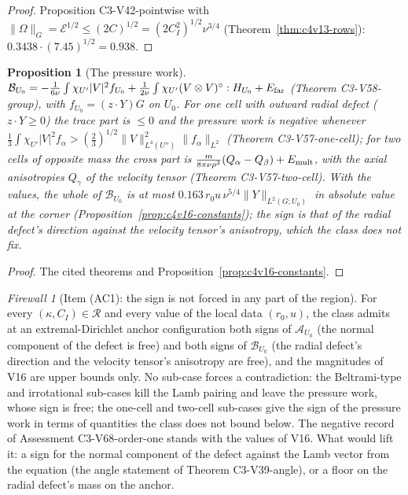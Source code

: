 \documentclass[11pt]{article}
\theoremstyle{plain}
\newtheorem{proposition}[theorem]{Proposition}
\theoremstyle{definition}
\theoremstyle{remark}
\newtheorem{firewall}[theorem]{Firewall}
\begin{document}
\begin{proof}
Proposition C3-V42-pointwise with \(\|\Omega\|_G=\mathcal E^{1/2}\le(2C)^{1/2}=(2C_I^2)^{1/2}\nu^{3/4}\)
(Theorem~\ref{thm:c4v13-rows}): \(0.3438\cdot(7.45)^{1/2}=0.938\).
\end{proof}

\begin{proposition}[The pressure work]
\label{prop:c4v17-pressure}
\(\mathcal B_{U_0}=-\frac1{6\nu}\int\chi_{U'}|V|^2f_{U_0}+\frac1{2\nu}\int\chi_{U'}(V\otimes V)^\circ:H_{U_0}+E_{\rm far}\) (Theorem C3-V58-group),
with \(f_{U_0}=(z\cdot Y)G\) on \(U_0\).  For one cell with outward radial defect
(\(z\cdot Y\ge0\)) the trace part is \(\le0\) and the pressure work is negative
whenever \(\frac13\int\chi_{U'}|V|^2f_\alpha>(\frac23)^{1/2}\|V\|_{L^4(U'')}^2\|f_\alpha\|_{L^2}\) (Theorem C3-V57-one-cell);
for two cells of opposite mass the cross part is
\(\frac m{8\pi\nu\rho^3}(Q_\alpha-Q_\beta)+E_{\rm mult}\), with the axial anisotropies \(Q_\gamma\) of the
velocity tensor (Theorem C3-V57-two-cell).  With the values, the
whole of \(\mathcal B_{U_0}\) is at most \(0.163\,r_0u\,\nu^{5/4}\|Y\|_{L^2(G;U_0)}\) in absolute value at
the corner (Proposition~\ref{prop:c4v16-constants}); the sign is that of
the radial defect's direction against the velocity tensor's
anisotropy, which the class does not fix.
\end{proposition}

\begin{proof}
The cited theorems and Proposition~\ref{prop:c4v16-constants}.
\end{proof}

\begin{firewall}[Item (AC1): the sign is not forced in any part of the region]
\label{fw:c4v17-sign}
For every \((\kappa,C_I)\in\mathcal R\) and every value of the local data \((r_0,u)\), the
class admits at an extremal-Dirichlet anchor configuration both
signs of \(\mathcal A_{U_0}\) (the normal component of the defect is free) and both
signs of \(\mathcal B_{U_0}\) (the radial defect's direction and the velocity
tensor's anisotropy are free), and the magnitudes of V16 are upper
bounds only.  No sub-case forces a contradiction: the Beltrami-type
and irrotational sub-cases kill the Lamb pairing and leave the
pressure work, whose sign is free; the one-cell and two-cell
sub-cases give the sign of the pressure work in terms of quantities
the class does not bound below.  The negative record of
Assessment C3-V68-order-one stands with the values of V16.  What
would lift it: a sign for the normal component of the defect against
the Lamb vector from the equation (the angle statement of Theorem
C3-V39-angle), or a floor on the radial defect's mass on the anchor.
\end{firewall}
\end{document}
